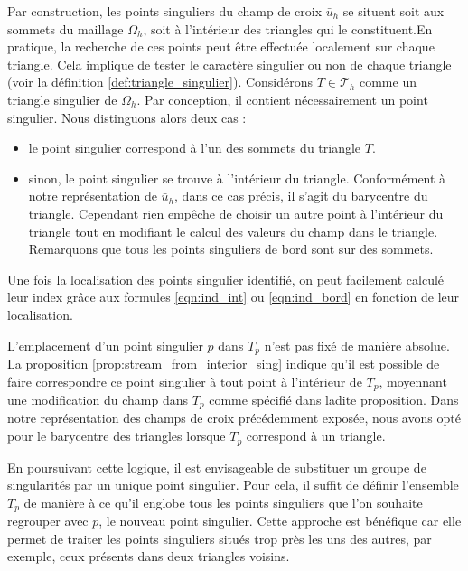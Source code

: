 Par construction, les points singuliers du champ de croix $\bar{u}_h$ se situent soit aux sommets du maillage $\Omega_h$, soit à l'intérieur des triangles qui le constituent.En pratique, la recherche de ces points peut être effectuée localement sur chaque triangle. Cela implique de tester le caractère singulier ou non de chaque triangle (voir la définition \ref{def:triangle_singulier}). Considérons $T\in\mathcal{T}_h$ comme un triangle singulier de $\Omega_h$. Par conception, il contient nécessairement un point singulier. Nous distinguons alors deux cas :\\
\begin{itemize}
 \item le point singulier correspond à l'un des sommets du triangle $T$.\\
 \item sinon, le point singulier se trouve à l'intérieur du triangle. Conformément à notre représentation de $\bar{u}_h$, dans ce cas précis, il s'agit du barycentre du triangle. Cependant rien empêche de choisir un autre point à l'intérieur du triangle tout en modifiant le calcul des valeurs du champ dans le triangle. Remarquons que tous les points singuliers de bord sont sur des sommets.\\
\end{itemize}

Une fois la localisation des points singulier identifié, on peut facilement calculé leur index grâce aux formules \ref{eqn:ind_int} ou \ref{eqn:ind_bord} en fonction de leur localisation.

\begin{remark}
L'emplacement d'un point singulier $p$ dans $T_p$ n'est pas fixé de manière absolue. La proposition \ref{prop:stream_from_interior_sing} indique qu'il est possible de faire correspondre ce point singulier à tout point à l'intérieur de $T_p$, moyennant une modification du champ dans $T_p$ comme spécifié dans ladite proposition. Dans notre représentation des champs de croix précédemment exposée, nous avons opté pour le barycentre des triangles lorsque $T_p$ correspond à un triangle.

En poursuivant cette logique, il est envisageable de substituer un groupe de singularités par un unique point singulier. Pour cela, il suffit de définir l'ensemble $T_p$ de manière à ce qu'il englobe tous les points singuliers que l'on souhaite regrouper avec $p$, le nouveau point singulier. Cette approche est bénéfique car elle permet de traiter les points singuliers situés trop près les uns des autres, par exemple, ceux présents dans deux triangles voisins.
\end{remark}

